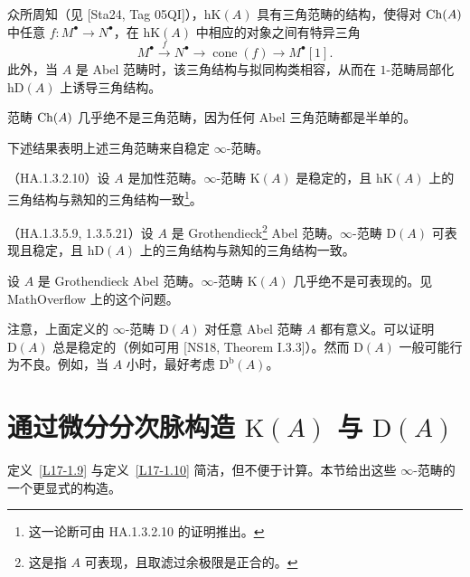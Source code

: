 \nitem\label{L17-1.13} 众所周知（见 [Sta24, Tag 05QI]），$\mathrm{hK}(A)$ 具有三角范畴的结构，使得对 $\operatorname{Ch}(A)$ 中任意 $f\colon M^{\bullet}\to N^{\bullet}$，在 $\mathrm{hK}(A)$ 中相应的对象之间有特异三角
\[
M^{\bullet}\xrightarrow{\ f\ }N^{\bullet}\to\operatorname{cone}(f)\to M^{\bullet}[1].
\]
此外，当 $A$ 是 Abel 范畴时，该三角结构与拟同构类相容，从而在 $1$-范畴局部化 $\mathrm{hD}(A)$ 上诱导三角结构。

\begin{warning}\label{L17-1.14}
范畴 $\operatorname{Ch}(A)$ 几乎绝不是三角范畴，因为任何 Abel 三角范畴都是半单的。
\end{warning}

\nitem\label{L17-1.15} 下述结果表明上述三角范畴来自稳定 $\infty$-范畴。

\begin{theorem}\label{L17-1.16}
（HA.1.3.2.10）设 $A$ 是加性范畴。$\infty$-范畴 $\mathrm{K}(A)$ 是稳定的，且 $\mathrm{hK}(A)$ 上的三角结构与熟知的三角结构一致\footnote{这一论断可由 HA.1.3.2.10 的证明推出。}。
\end{theorem}

\begin{theorem}\label{L17-1.17}
（HA.1.3.5.9, 1.3.5.21）设 $A$ 是 Grothendieck\footnote{这是指 $A$ 可表现，且取滤过余极限是正合的。} Abel 范畴。$\infty$-范畴 $\mathrm{D}(A)$ 可表现且稳定，且 $\mathrm{hD}(A)$ 上的三角结构与熟知的三角结构一致。
\end{theorem}

\begin{warning}\label{L17-1.18}
设 $A$ 是 Grothendieck Abel 范畴。$\infty$-范畴 $\mathrm{K}(A)$ 几乎绝不是可表现的。见 MathOverflow 上的这个问题。
\end{warning}

\begin{remark}\label{L17-1.19}
注意，上面定义的 $\infty$-范畴 $\mathrm{D}(A)$ 对任意 Abel 范畴 $A$ 都有意义。可以证明 $\mathrm{D}(A)$ 总是稳定的（例如可用 [NS18, Theorem I.3.3]）。然而 $\mathrm{D}(A)$ 一般可能行为不良。例如，当 $A$ 小时，最好考虑 $\mathrm{D}^{\mathrm{b}}(A)$。
\end{remark}

\section{通过微分分次脉构造 $\mathrm{K}(A)$ 与 $\mathrm{D}(A)$}

\nitem\label{L17-2.1} 定义~\ref{L17-1.9} 与定义~\ref{L17-1.10} 简洁，但不便于计算。本节给出这些 $\infty$-范畴的一个更显式的构造。

